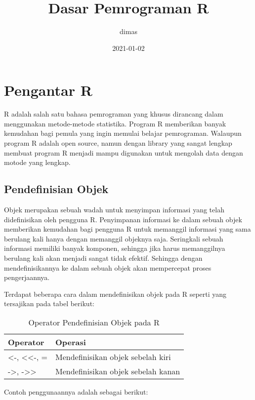 \documentclass[
]{book}
\title{Dasar Pemrograman R}
\author{dimas}
\date{2021-01-02}
\begin{document}
\maketitle

{
\setcounter{tocdepth}{1}
\tableofcontents
}
\hypertarget{pengantar-r}{%
\chapter{Pengantar R}\label{pengantar-r}}

R adalah salah satu bahasa pemrograman yang khusus dirancang dalam menggunakan metode-metode statistika. Program R memberikan banyak kemudahan bagi pemula yang ingin memulai belajar pemrograman. Walaupun program R adalah open source, namun dengan library yang sangat lengkap membuat program R menjadi mampu digunakan untuk mengolah data dengan motode yang lengkap.

\hypertarget{pendefinisian-objek}{%
\section{Pendefinisian Objek}\label{pendefinisian-objek}}

Objek merupakan sebuah wadah untuk menyimpan informasi yang telah didefinisikan oleh pengguna R. Penyimpanan informasi ke dalam sebuah objek memberikan kemudahan bagi pengguna R untuk memanggil informasi yang sama berulang kali hanya dengan memanggil objeknya saja. Seringkali sebuah informasi memiliki banyak komponen, sehingga jika harus memanggilnya berulang kali akan menjadi sangat tidak efektif. Sehingga dengan mendefinisikannya ke dalam sebuah objek akan mempercepat proses pengerjaannya.

Terdapat beberapa cara dalam mendefinisikan objek pada R seperti yang tersajikan pada tabel berikut:

\begin{table}

\caption{\label{tab:unnamed-chunk-1}Operator Pendefinisian Objek pada R}
\centering
\begin{tabular}[t]{ll}
\toprule
Operator & Operasi\\
\midrule
<-, <<-, = & Mendefinisikan objek sebelah kiri\\
->, ->> & Mendefinisikan objek sebelah kanan\\
\bottomrule
\end{tabular}
\end{table}

Contoh penggunaannya adalah sebagai berikut:
\end{document}
